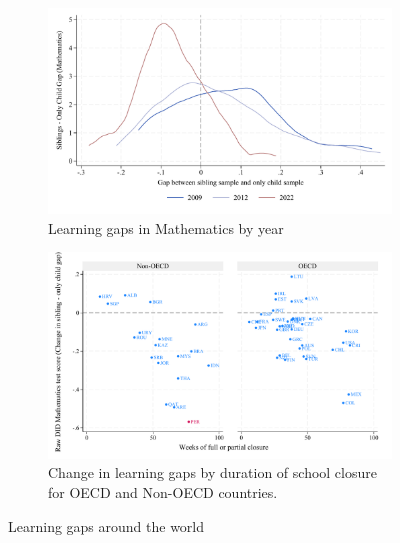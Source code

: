 


\begin{figure}[htbp]
    \centering
    
    \begin{subfigure}{\textwidth}
        \centering
        \includegraphics[width=\textwidth]{./FIGURES/Descriptive/PISA_gap_PV1MATH_histogram_2009_2022.pdf}
        \caption{Learning gaps in Mathematics by year}
        \label{fig:1a}
    \end{subfigure}
    
    \vspace{1em} %
    
    \begin{subfigure}{\textwidth}
        \centering
        \includegraphics[width=\textwidth]{./FIGURES/Descriptive/PISA_raw_DID_PV1MATH_not_fully_open.pdf}
        \caption{Change in learning gaps by duration of school closure for OECD and Non-OECD countries.}
        \label{fig:1b}
    \end{subfigure}
    
    \caption{Learning gaps around the world}
    \label{fig:combined}
\end{figure}


